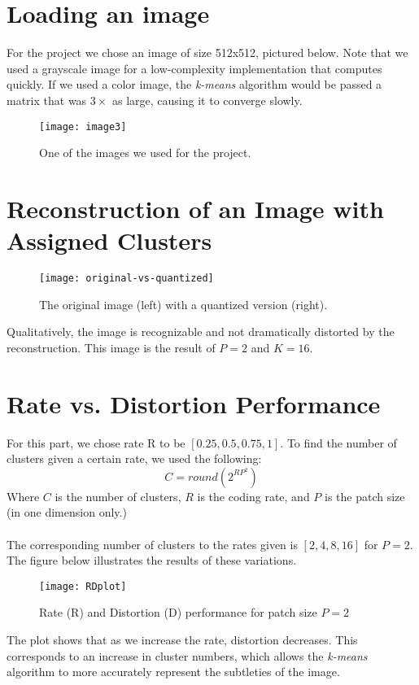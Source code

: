 \documentclass[]{../ncmathy}
\begin{document}
	
\section{Loading an image}
	For the project we chose an image of size 512x512, pictured below. Note that we used a grayscale image for a low-complexity implementation that computes quickly. If we used a color image, the \textit{k-means} algorithm would be passed a matrix that was $3\times$ as large, causing it to converge slowly.
	\begin{figure}[H]
		\centering\texttt{[image: image3]}
		\caption{One of the images we used for the project.}
	\end{figure}
	
\section{Reconstruction of an Image with Assigned Clusters}
	\begin{figure}[H]
		\centering\texttt{[image: original-vs-quantized]}
		\caption{The original image (left) with a quantized version (right).}
	\end{figure}
	Qualitatively, the image is recognizable and not dramatically distorted by the reconstruction. This image is the result of $P=2$ and $K=16$. 
	
\section{Rate vs. Distortion Performance}
	For this part, we chose rate R to be $[0.25, 0.5, 0.75, 1]$. To find the number of clusters given a certain rate, we used the following:
	\begin{equation}
		 C = round(2^{RP^2})
		 \label{clusters}
	\end{equation}
	Where $C$ is the number of clusters, $R$ is the coding rate, and $P$ is the patch size (in one dimension only.)  
	\\\\
	The corresponding number of clusters to the rates given is $[2, 4, 8, 16]$ for $P = 2$. The figure below illustrates the results of these variations.
	\begin{figure}[H]
		\centering\texttt{[image: RDplot]}
		\caption{Rate (R) and Distortion (D) performance for patch size $P=2$}
	\end{figure} 
	The plot shows that as we increase the rate, distortion decreases. This corresponds to an increase in cluster numbers, which allows the \textit{k-means} algorithm to more accurately represent the subtleties of the image. 
\end{document}
